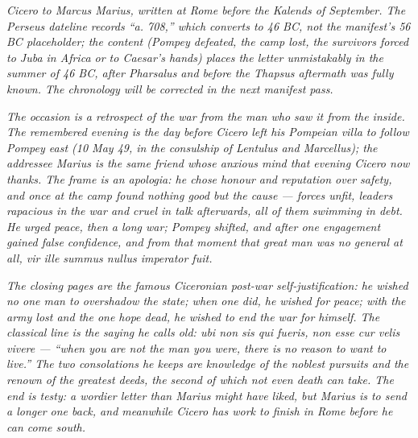 
\textit{Cicero to Marcus Marius, written at Rome before the
Kalends of September. The Perseus dateline records ``a. 708,''
which converts to 46 BC, not the manifest's 56 BC placeholder;
the content (Pompey defeated, the camp lost, the survivors
forced to Juba in Africa or to Caesar's hands) places the
letter unmistakably in the summer of 46 BC, after Pharsalus
and before the Thapsus aftermath was fully known. The
chronology will be corrected in the next manifest pass.}

\textit{The occasion is a retrospect of the war from the man
who saw it from the inside. The remembered evening is the day
before Cicero left his Pompeian villa to follow Pompey east
(10 May 49, in the consulship of Lentulus and Marcellus); the
addressee Marius is the same friend whose anxious mind that
evening Cicero now thanks. The frame is an apologia: he chose
\textit{honour and reputation} over safety, and once at the
camp found nothing good but the cause --- forces unfit, leaders
rapacious in the war and cruel in talk afterwards, all of them
swimming in debt. He urged peace, then a long war; Pompey
shifted, and after one engagement gained false confidence, and
\textit{from that moment that great man was no general at all},
\textit{vir ille summus nullus imperator fuit}.}

\textit{The closing pages are the famous Ciceronian post-war
self-justification: he wished no one man to overshadow the
state; when one did, he wished for peace; with the army lost
and the one hope dead, he wished to end the war for himself.
The classical line is the saying he calls old: \textit{ubi non
sis qui fueris, non esse cur velis vivere} --- ``when you are
not the man you were, there is no reason to want to live.''
The two consolations he keeps are knowledge of the noblest
pursuits and the renown of the greatest deeds, the second of
which not even death can take. The end is testy: a wordier
letter than Marius might have liked, but Marius is to send a
longer one back, and meanwhile Cicero has work to finish in
Rome before he can come south.}

